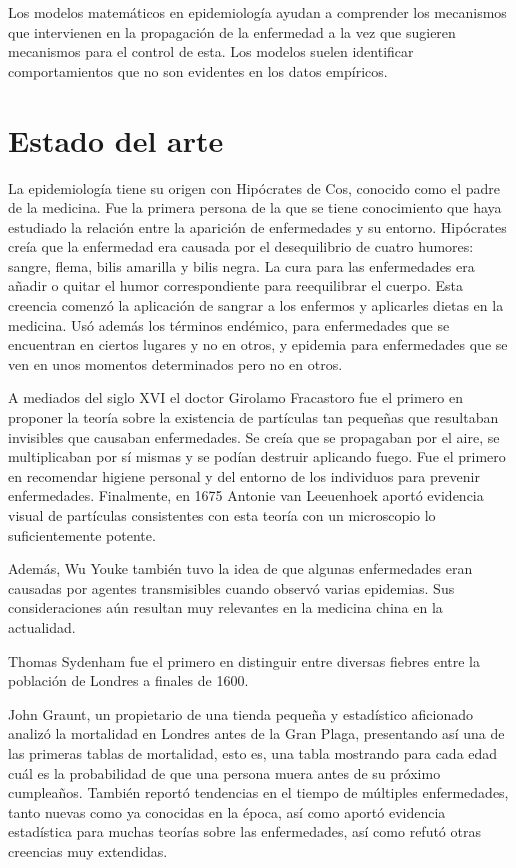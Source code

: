 Los modelos matemáticos en epidemiología ayudan a comprender los mecanismos que intervienen en la propagación de la enfermedad a la vez que sugieren mecanismos para el control de esta. Los modelos suelen identificar comportamientos que no son evidentes en los datos empíricos.


\section{Estado del arte}

La epidemiología tiene su origen con Hipócrates de Cos, conocido como el padre de la medicina. Fue la primera persona de la que se tiene conocimiento que haya estudiado la relación entre la aparición de enfermedades y su entorno. Hipócrates creía que la enfermedad era causada por el desequilibrio de cuatro humores: sangre, flema, bilis amarilla y bilis negra. La cura para las enfermedades era añadir o quitar el humor correspondiente para reequilibrar el cuerpo. Esta creencia comenzó la aplicación de sangrar a los enfermos y aplicarles dietas en la medicina. Usó además los términos endémico, para enfermedades que se encuentran en ciertos lugares y no en otros, y epidemia para enfermedades que se ven en unos momentos determinados pero no en otros.

A mediados del siglo XVI el doctor Girolamo Fracastoro fue el primero en proponer la teoría sobre la existencia de partículas tan pequeñas que resultaban invisibles que causaban enfermedades. Se creía que se propagaban por el aire, se multiplicaban por sí mismas y se podían destruir aplicando fuego. Fue el primero en recomendar higiene personal y del entorno de los individuos para prevenir enfermedades. Finalmente, en 1675 Antonie van Leeuenhoek aportó evidencia visual de partículas consistentes con esta teoría con un microscopio lo suficientemente potente.

Además, Wu Youke también tuvo la idea de que algunas enfermedades eran causadas por agentes transmisibles cuando observó varias epidemias. Sus consideraciones aún resultan muy relevantes en la medicina china en la actualidad.

Thomas Sydenham fue el primero en distinguir entre diversas fiebres entre la población de Londres a finales de 1600.

John Graunt, un propietario de una tienda pequeña y estadístico aficionado analizó la mortalidad en Londres antes de la Gran Plaga, presentando así una de las primeras tablas de mortalidad, esto es, una tabla mostrando para cada edad cuál es la probabilidad de que una persona muera antes de su próximo cumpleaños. También reportó tendencias en el tiempo de múltiples enfermedades, tanto nuevas como ya conocidas en la época, así como aportó evidencia estadística para muchas teorías sobre las enfermedades, así como refutó otras creencias muy extendidas.

